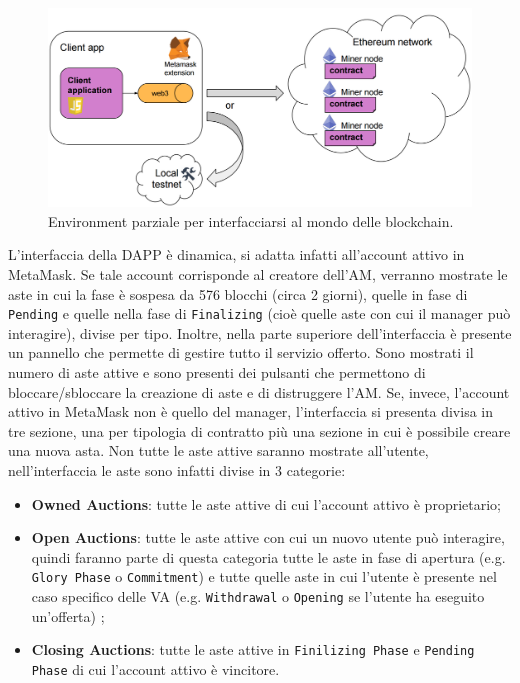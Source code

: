 \begin{figure}[h]
	\centering
	\includegraphics[scale=0.3]{suite.png}
	\caption{Environment parziale per interfacciarsi al mondo delle blockchain.}\label{fig1.2}
\end{figure}
L'interfaccia della DAPP è dinamica, si adatta infatti all'account attivo in MetaMask. Se tale account corrisponde al creatore dell'AM, verranno mostrate le aste in cui la fase è sospesa da 576 blocchi (circa 2 giorni), quelle in fase di \texttt{Pending} e quelle nella fase di \texttt{Finalizing} (cioè quelle aste con cui il manager può interagire), divise per tipo. Inoltre, nella parte superiore dell'interfaccia è presente un pannello che permette di gestire tutto il servizio offerto. Sono mostrati il numero di aste attive e sono presenti dei pulsanti che permettono di bloccare/sbloccare la creazione di aste e di distruggere l'AM.
Se, invece, l'account attivo in MetaMask non è quello del manager, l'interfaccia si presenta divisa in tre sezione, una per tipologia di contratto più una sezione in cui è possibile creare una nuova asta. Non tutte le aste attive saranno mostrate all'utente, nell'interfaccia le aste sono infatti divise in 3 categorie:
\begin{itemize}
	\item \textbf{Owned Auctions}: tutte le aste attive di cui l'account attivo è proprietario;
	\item \textbf{Open Auctions}: tutte le aste attive con cui un nuovo utente può interagire, quindi faranno parte di questa categoria tutte le aste in fase di apertura (e.g. \texttt{Glory Phase} o \texttt{Commitment})  e tutte quelle aste in cui l'utente è presente nel caso specifico delle VA (e.g. \texttt{Withdrawal} o \texttt{Opening} se l'utente ha eseguito un'offerta) ;
	\item \textbf{Closing Auctions}: tutte le aste attive in \texttt{Finilizing Phase} e \texttt{Pending Phase}  di cui l'account attivo è vincitore.
\end{itemize}
